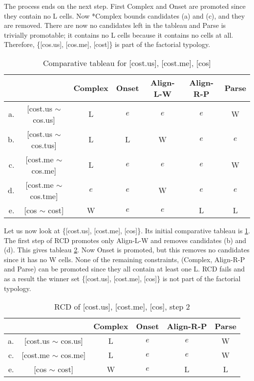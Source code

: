 \documentclass[11pt]{article}
\begin{document}
The process ends on the next step. First {\sc *Complex} and {\sc
  Onset} are promoted since they contain no L cells. Now {\sc
  *Complex} bounds candidates (a) and (c), and they are removed. There
are now no candidates left in the tableau and {\sc Parse} is trivially
promotable; it contains no L cells because it contains no cells at
all. Therefore, \{[cos.us], [cos.me], [cost]\} is part of the
factorial typology.

\begin{table}
\begin{tabular}{|rc||c|c|c|c|c|}\hline
 && {\sc *Complex} & {\sc Onset} & {\sc Align-L-W} & {\sc Align-R-P} & {\sc Parse} \\ \hline\hline
 a. & [cost.us $\sim$ cos.us] & L & $e$ &$e$  &$e$  & W\\ \hline
 b. & [cost.us $\sim$ cos.tus] &L &L & W &$e$ &$e$\\ \hline
 c. & [cost.me $\sim$ cos.me] &L &$e$ &$e$ & $e$& W\\ \hline
 d. & [cost.me $\sim$ cos.tme] & $e$ &$e$ & W &$e$ &$e$\\ \hline
 e. & [cos $\sim$ cost] & W & $e$ &$e$ & L & L \\ \hline
\end{tabular}
  \caption{Comparative tableau for [cost.us], [cost.me], [cos]}
  \label{tableau-cmp-costus-costme-cos}
\end{table}

Let us now look at \{[cost.us], [cost.me], [cos]\}. Its initial
comparative tableau is \ref{tableau-cmp-costus-costme-cos}. The first
step of RCD promotes only {\sc Align-L-W} and removes candidates (b)
and (d). This gives tableau \ref{tableau-cmp-costus-costme-cos2}. Now
{\sc Onset} is promoted, but this removes no candidates since it has
no W cells. None of the remaining constraints, ({\sc *Complex}, {\sc
  Align-R-P} and {\sc Parse}) can be promoted since they all contain
at least one L. RCD fails and as a result the winner set \{[cost.us],
[cost.me], [cos]\} is not part of the factorial typology.

\begin{table}
\begin{tabular}{|rc||c|c|c|c|}\hline
 && {\sc *Complex} & {\sc Onset} & {\sc Align-R-P} & {\sc Parse} \\ \hline\hline
 a. & [cost.us $\sim$ cos.us] & L & $e$ &$e$  & W\\ \hline
 c. & [cost.me $\sim$ cos.me] &L &$e$ & $e$& W\\ \hline
 e. & [cos $\sim$ cost] & W & $e$ & L & L \\ \hline
\end{tabular}
  \caption{RCD of [cost.us], [cost.me], [cos], step 2}
  \label{tableau-cmp-costus-costme-cos2}
\end{table}
\end{document}
